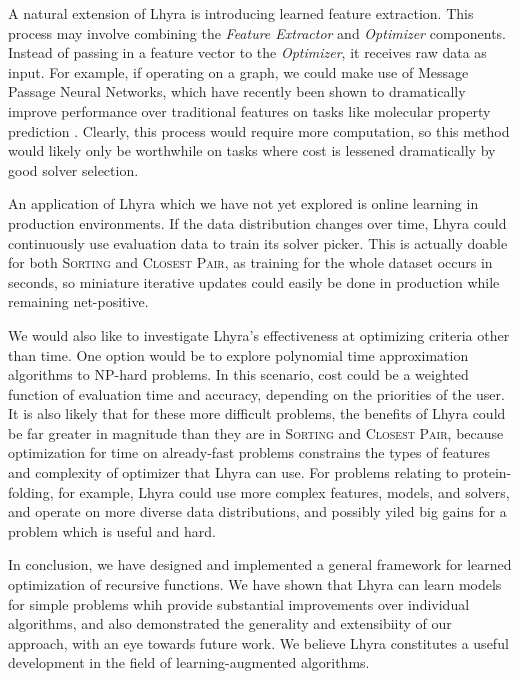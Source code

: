 \documentclass{article}
\begin{document}
A natural extension of Lhyra is introducing learned feature extraction. This process may involve combining the \textit{Feature Extractor} and \textit{Optimizer} components. Instead of passing in a feature vector to the \textit{Optimizer}, it receives raw data as input. For example, if operating on a graph, we could make use of Message Passage Neural Networks, which have recently been shown to dramatically improve performance over traditional features on tasks like molecular property prediction \cite{GilmerSRVD17}. Clearly, this process would require more computation, so this method would likely only be worthwhile on tasks where cost is lessened dramatically by good solver selection.

An application of Lhyra which we have not yet explored is online learning in production environments.  If the data distribution changes over time, Lhyra could continuously use evaluation data to train its solver picker.  This is actually doable for both \textsc{Sorting} and \textsc{Closest Pair}, as training for the whole dataset occurs in seconds, so miniature iterative updates could easily be done in production while remaining net-positive.

We would also like to investigate Lhyra's effectiveness at optimizing criteria other than time. One option would be to explore polynomial time approximation algorithms to NP-hard problems. In this scenario, cost could be a weighted function of evaluation time and accuracy, depending on the priorities of the user. It is also likely that for these more difficult problems, the benefits of Lhyra could be far greater in magnitude than they are in \textsc{Sorting} and \textsc{Closest Pair}, because optimization for time on already-fast problems constrains the types of features and complexity of optimizer that Lhyra can use. For problems relating to protein-folding, for example, Lhyra could use more complex features, models, and solvers, and operate on more diverse data distributions, and possibly yiled big gains for a problem which is useful and hard.

In conclusion, we have designed and implemented a general framework for learned optimization of recursive functions. We have shown that Lhyra can learn models for simple problems whih provide substantial improvements over individual algorithms, and also demonstrated the generality and extensibiity of our approach, with an eye towards future work. We believe Lhyra constitutes a useful development in the field of learning-augmented algorithms.
\end{document}
